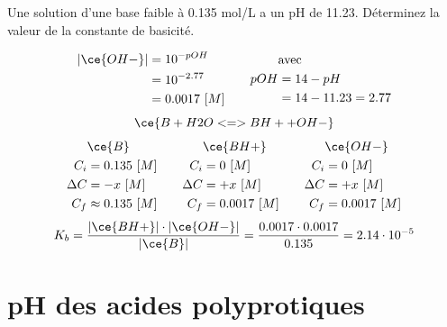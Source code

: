 \documentclass[
  11pt,
  a4paper,
  openany]{book}
\begin{document}
\begin{Exercise}
Une solution d'une base faible à 0.135 mol/L a un pH de 11.23. Déterminez la valeur de la constante de basicité.

\end{Exercise}

\begin{Answer}
\[
\begin{split}
|\ce{OH-}| &= 10^{-pOH} \\
 &= 10^{-2.77} \\
 &= 0.0017\ [M]
\end{split}
\qquad
\begin{split}
&\text{avec} \\
pOH &= 14 - pH \\
  &= 14 - 11.23 = 2.77
\end{split}
\]
\[
\ce{B + H2O <=> BH+ + OH-}
\]
\[
\begin{split}
&\ce{B}\\
C_i &= 0.135\ [M] \\
\Delta C &= - x\ [M] \\
C_f &\approx 0.135\ [M] \\
\end{split}
\qquad
\begin{split}
&\ce{BH+}\\
C_i &= 0\ [M] \\
\Delta C &= + x\ [M] \\
C_f &= 0.0017\ [M] \\
\end{split}
\qquad
\begin{split}
&\ce{OH-}\\
C_i &= 0\ [M] \\
\Delta C &= + x\ [M] \\
C_f &= 0.0017\ [M] \\
\end{split}
\]
\[
K_b = \frac{|\ce{BH+}| \cdot |\ce{OH-}|}{|\ce{B}|} = \frac{0.0017 \cdot 0.0017}{0.135} = 2.14 \cdot 10^{-5}
\]

\end{Answer}

\clearpage

\hypertarget{ph-des-acides-polyprotiques}{%
\section{pH des acides polyprotiques}\label{ph-des-acides-polyprotiques}}
\end{document}
